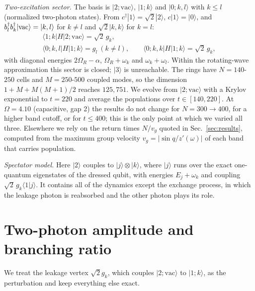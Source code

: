 \documentclass[aps,prresearch,twocolumn,superscriptaddress,nofootinbib,longbibliography,floatfix]{revtex4-2}
\begin{document}
\emph{Two-excitation sector.} The basis is $|2;\mathrm{vac}\rangle$, $|1;k\rangle$ and $|0;k,l\rangle$ with $k\le l$
(normalized two-photon states). From $c^\dagger|1\rangle=\sqrt2|2\rangle$, $c|1\rangle=|0\rangle$, and
$b_l^\dagger b_k^\dagger|{\rm vac}\rangle=|k,l\rangle$ for $k\neq l$ and $\sqrt2|k,k\rangle$ for $k=l$:
\begin{gather}
\langle1;k|H|2;\mathrm{vac}\rangle=\sqrt2\,g_k,\nonumber\\
\langle0;k,l|H|1;k\rangle=g_l\ (k\neq l),\qquad
\langle0;k,k|H|1;k\rangle=\sqrt2\,g_k ,
\end{gather}
with diagonal energies $2\Omega_R-\alpha$, $\Omega_R+\omega_k$ and $\omega_k+\omega_l$. Within the rotating-wave
approximation this sector is closed; $|3\rangle$ is unreachable. The rings have $N=140$-$250$ cells and $M=250$-$500$
coupled modes, so the dimension $1+M+M(M+1)/2$ reaches $125{,}751$. We evolve from $|2;\mathrm{vac}\rangle$ with a
Krylov exponential to $t=220$ and average the populations over $t\in[140,220]$. At $\Omega=4.10$ (capacitive, gap 2)
the results do not change for $N=300\to400$, for a higher band cutoff, or for $t\le400$; this is the only point at which
we varied all three. Elsewhere we rely on the return times $N/v_g$ quoted in Sec.~\ref{sec:results}, computed from the
maximum group velocity $v_g=|\sin q/z'(\omega)|$ of each band that carries population.

\emph{Spectator model.} Here $|2\rangle$ couples to $|j\rangle\otimes|k\rangle$, where $|j\rangle$ runs over the exact
one-quantum eigenstates of the dressed qubit, with energies $E_j+\omega_k$ and coupling $\sqrt2\,g_k\langle1|j\rangle$.
It contains all of the dynamics except the exchange process, in which the leakage photon is reabsorbed and the other
photon plays its role.

\section{Two-photon amplitude and branching ratio}\label{app:amp}

We treat the leakage vertex $\sqrt2g_k$, which couples $|2;\mathrm{vac}\rangle$ to $|1;k\rangle$, as the perturbation and
keep everything else exact.
\end{document}
